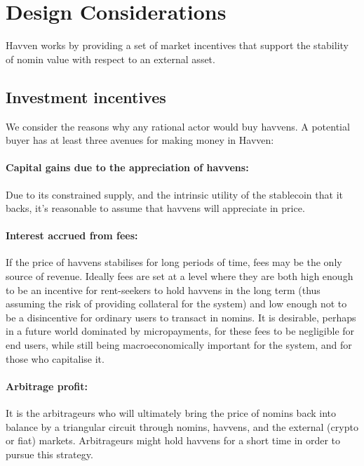 \section{Design Considerations}

Havven works by providing a set of market incentives that support the stability of nomin value with respect to an external asset.


\subsection{Investment incentives}

We consider the reasons why any rational actor would buy havvens. A potential buyer has at least three avenues for making money in Havven:

\paragraph{Capital gains due to the appreciation of havvens:}
Due to its constrained supply, and the intrinsic utility of the stablecoin that it backs, it's reasonable to assume that
havvens will appreciate in price.

\paragraph{Interest accrued from fees:}
If the price of havvens stabilises for long periods of time, fees may be the only source of revenue. Ideally fees are set at a level where they are both high enough to be an incentive for rent-seekers to hold havvens in the long term (thus assuming the risk of providing collateral for the system) and low enough not to be a disincentive for ordinary users to transact in nomins.
It is desirable, perhaps in a future world dominated by micropayments, for these fees to be negligible for end users, while still being macroeconomically important for the system, and for those who capitalise it.

\paragraph{Arbitrage profit:}
It is the arbitrageurs who will ultimately bring the price of nomins back into balance by a triangular circuit through nomins, havvens, and the external (crypto or fiat) markets. Arbitrageurs might hold havvens for a short time in order to pursue this strategy.


